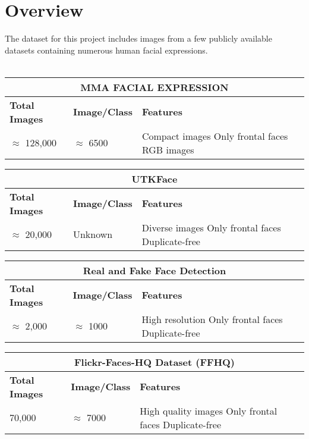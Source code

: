 \section{Overview}
    \noindent The dataset for this project includes images from a few publicly available datasets containing numerous human facial expressions.\\\\
\vspace*{1em}

\begin{tabular}{ |p{3cm}||p{3cm} ||p{3cm} | }
    \hline
    \multicolumn{3}{|c|}{\textbf{MMA FACIAL EXPRESSION}} \\
    \hline
    \textbf{Total Images} & \textbf{Image/Class } & \textbf{Features}\\
    \hline
    $\approx$ 128,000 & $\approx$ 6500 & Compact images Only frontal faces RGB images\\
    \hline
\end{tabular}
\vspace*{1em}

\begin{tabular}{ |p{3cm}||p{3cm} ||p{3cm} | }
    \hline
    \multicolumn{3}{|c|}{\textbf{UTKFace}} \\
    \hline
    \textbf{Total Images} & \textbf{Image/Class } & \textbf{Features}\\
    \hline
    $\approx$ 20,000 & Unknown & Diverse images Only frontal faces Duplicate-free\\
    \hline
\end{tabular}
\vspace*{1em}

\begin{tabular}{ |p{3cm}||p{3cm} ||p{3cm} | }
    \hline
    \multicolumn{3}{|c|}{\textbf{Real and Fake Face Detection}} \\
    \hline
    \textbf{Total Images} & \textbf{Image/Class } & \textbf{Features}\\
    \hline
    $\approx$ 2,000 & $\approx$ 1000 & High resolution Only frontal faces Duplicate-free\\
    \hline
\end{tabular}
\vspace*{1em}

    \begin{tabular}{ |p{3cm}||p{3cm} ||p{3cm} | }
        \hline
        \multicolumn{3}{|c|}{\textbf{Flickr-Faces-HQ Dataset (FFHQ)}} \\
        \hline
        \textbf{Total Images} & \textbf{Image/Class } & \textbf{Features}\\
        \hline
        70,000 & $\approx$ 7000 & High quality images Only frontal faces Duplicate-free\\
        \hline
    \end{tabular}
    \vspace*{2em}

